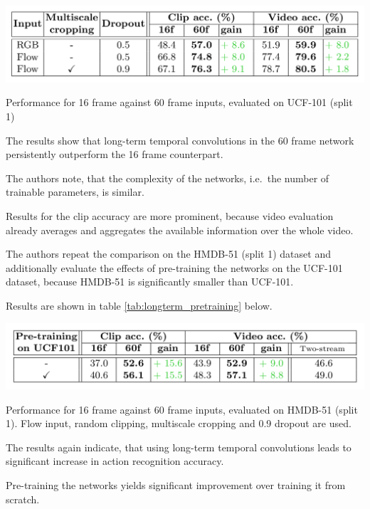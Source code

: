 \begin{table}[H]
    \centering
    \includegraphics[width=\textwidth]{img_deep/longterm_16vs60}
    \caption{Performance for 16 frame against 60 frame inputs, evaluated on UCF-101 (split 1) \cite{varol_long-term_2016}}
    \label{tab:longterm_16vs60}
\end{table}

The results show that long-term temporal convolutions in the 60 frame network persistently outperform the 16 frame counterpart.

The authors note, that the complexity of the networks, i.e.\ the number of trainable parameters, is similar.

Results for the clip accuracy are more prominent, because video evaluation already averages and aggregates the available information over the whole video.

The authors repeat the comparison on the HMDB-51 (split 1) dataset and additionally evaluate the effects of pre-training the networks on the UCF-101 dataset, because HMDB-51 is significantly smaller than UCF-101.

Results are shown in table \ref{tab:longterm_pretraining} below.

\begin{table}[H]
    \centering
    \includegraphics[width=\textwidth]{img_deep/longterm_pretraining}
    \caption{Performance for 16 frame against 60 frame inputs, evaluated on HMDB-51 (split 1). Flow input, random clipping, multiscale cropping and 0.9 dropout are used. \cite{varol_long-term_2016}}
    \label{tab:longterm_pretraining}
\end{table}

The results again indicate, that using long-term temporal convolutions leads to significant increase in action recognition accuracy.

Pre-training the networks yields significant improvement over training it from scratch. 

